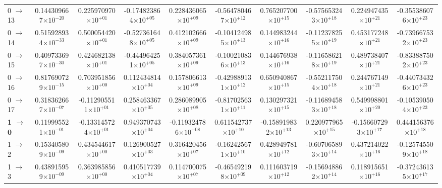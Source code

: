 \documentclass[reviewcopy]{elsarticle}
\begin{document}
\begin{landscape}
\begin{longtable}{lccccccccc}
 0 $\to$ 13  & 0.144309667$\times10^{-20}$  & 0.225970970$\times10^{+01}$  & -0.174823864$\times10^{+05}$  & 0.228436065$\times10^{+09}$  & -0.564780467$\times10^{+12}$  & 0.765207700$\times10^{+15}$  & -0.575653243$\times10^{+18}$  & 0.224947435$\times10^{+21}$  & -0.355386076$\times10^{+23}$ \\
 0 $\to$ 14  & 0.515928934$\times10^{-33}$  & 0.500054420$\times10^{+01}$  & -0.527361648$\times10^{+05}$  & 0.412102666$\times10^{+09}$  & -0.104124985$\times10^{+13}$  & 0.144983244$\times10^{+16}$  & -0.112378255$\times10^{+19}$  & 0.453177248$\times10^{+21}$  & -0.739667532$\times10^{+23}$ \\
0 $\to$  15  & 0.409733697$\times10^{-30}$  & 0.424682138$\times10^{+01}$  & -0.444964251$\times10^{+05}$  & 0.384057361$\times10^{+09}$  & -0.100210836$\times10^{+13}$  & 0.144676938$\times10^{+16}$  & -0.116586218$\times10^{+19}$  & 0.489738407$\times10^{+21}$  & -0.833887502$\times10^{+23}$ \\
 0 $\to$ 16  & 0.817690729$\times10^{-15}$  & 0.703951856$\times10^{+00}$  & 0.112434814$\times10^{+04}$  & 0.157806613$\times10^{+09}$  & -0.429889131$\times10^{+12}$  & 0.650940867$\times10^{+15}$  & -0.552117504$\times10^{+18}$  & 0.244767149$\times10^{+21}$  & -0.440734326$\times10^{+23}$ \\
 0 $\to$ 17  & 0.318362667$\times10^{-07}$  & -0.112905511$\times10^{+01}$  & 0.258463367$\times10^{+05}$  & 0.286089905$\times10^{+08}$  & -0.817025631$\times10^{+11}$  & 0.130297321$\times10^{+15}$  & -0.116894583$\times10^{+18}$  & 0.549998801$\times10^{+20}$  & -0.105390504$\times10^{+23}$ 
  \\[7pt]
{\bf 1 $\to$ 0}  & 0.119995521$\times10^{-01}$  & -0.133145724$\times10^{+01}$  & 0.949370743$\times10^{+04}$  & -0.119324786$\times10^{+08}$  & 0.611542737$\times10^{+10}$  & -0.158919832$\times10^{+13}$  & 0.220977965$\times10^{+15}$  & -0.156607293$\times10^{+17}$  & 0.444156376$\times10^{+18}$ \\
1 $\to$ 2  & 0.153405809$\times10^{-09}$  & 0.434544617$\times10^{+00}$  & 0.126900527$\times10^{+03}$  & 0.316420456$\times10^{+07}$  & -0.162425671$\times10^{+10}$  & 0.428949781$\times10^{+12}$  & -0.607065893$\times10^{+14}$  & 0.437214022$\times10^{+16}$  & -0.125745509$\times10^{+18}$ \\
1 $\to$ 3  & 0.438915959$\times10^{-09}$  & 0.363985856$\times10^{+00}$  & 0.410517739$\times10^{+04}$  & 0.114700075$\times10^{+07}$  & -0.465492198$\times10^{+09}$  & 0.111603719$\times10^{+12}$  & -0.156948862$\times10^{+14}$  & 0.118915651$\times10^{+16}$  & -0.372436135$\times10^{+17}$ \\

\end{longtable}
\end{landscape}
\end{document}
